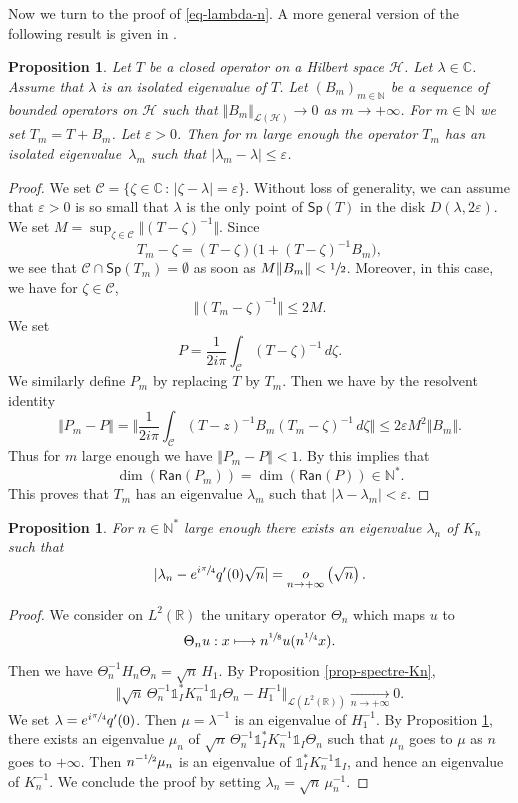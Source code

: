 \documentclass[11pt]{article}
\numberwithin{equation}{section}
\let\mathcal\mathscr
\def\mto{\mathchoice{\longmapsto}{\mapsto}{\mapsto}{\mapsto}}
\theoremstyle{plain}
\newtheorem{proposition}[theorem]{Proposition}
\theoremstyle{definition}
\newcommand {\limt}[2]{\xrightarrow[#1 \to #2]{}}
\newcommand{\abs}[1]{\vert #1\vert}
\newcommand{\nr}[1]{\Vert #1\Vert}
\newcommand{\bnr}[1]{\bigl\Vert #1\bigr\Vert}
\newcommand{\bbnr}[1]{\biggl\Vert #1\biggr\Vert}
\newcommand{\set}[1]{\{ #1\}}
\newcommand{\inv}{^{-1}}
\newcommand{\littleo}[2]{\mathop{o}\limits_{#1 \to #2}}
\newcommand{\1}{\mathds 1}
\newcommand{\st}{\,:\,}
\newcommand{\Sp}{\mathsf{Sp}}
\newcommand{\Ran}{\mathsf{Ran}}
\newcommand{\R}{\mathbb{R}}
\def\C{\mathbb{C}}
\newcommand{\N}{\mathbb{N}}
\let\e\varepsilon
\let\z\zeta
\let\Th\Theta
\let\l\lambda
\let\m\mu
\newcommand{\Hc}{{\mathcal H}}
\newcommand{\Lc}{{\mathcal L}}
\begin{document}
Now we turn to the proof of \eqref{eq-lambda-n}. A more general version of the following result is given in \cite[\S IV.3.5]{kato}.

\begin{proposition} \label{prop-perturbation-vp-kato}
Let $T$ be a closed operator on a Hilbert space $\Hc$. Let $\l \in \C$. Assume that $\l$ is an isolated eigenvalue of $T$. Let $(B_m)_{m \in \N}$ be a sequence of bounded operators on $\Hc$ such that $\nr{B_m}_{\Lc(\Hc)} \to 0$ as $m \to +\infty$. For $m \in \N$ we set \hbox{$T_m = T+B_m$}. Let $\e > 0$. Then for $m$ large enough the operator $T_m$ has an isolated eigenvalue~$\l_m$ such that $\abs{\l_m-\l} \leq \e$.
\end{proposition}

\begin{proof}
We set $\mathcal C = \set {\z \in \C\st \abs {\z - \l} = \e}$. Without loss of generality, we can assume that $\e> 0$ is so small that $\l$ is the only point of $\Sp(T)$ in the disk $D(\l,2\e)$. We set $M = \sup_{\z \in \mathcal C} \nr{(T-\z)\inv}$. Since
\[
T_m - \z = (T-\z) \bigl(1 + (T-\z)\inv B_m \bigr),
\]
we see that $\mathcal C \cap \Sp(T_m) = \emptyset$ as soon as $M \nr{B_m} < \sfrac 1 2$. Moreover, in this case, we have for $\z \in \mathcal C$,
\[
\nr{(T_m-\z)\inv} \leq 2 M.
\]
We set
\[
P = \frac 1 {2i\pi} \int_{\mathcal C} (T-\z)\inv \, d\z.
\]
We similarly define $P_m$ by replacing $T$ by $T_m$. Then we have by the resolvent identity
\[
\nr{P_m - P} = \bbnr{\frac 1 {2i\pi} \int_{\mathcal C} (T-z)\inv B_m (T_m-\z)\inv \, d\z} \leq 2\e M^2 \Vert B_m \Vert.
\]
Thus for $m$ large enough we have $\nr{P_m - P} < 1$. By \cite[\S I.4.6]{kato} this implies that
\[
\dim (\Ran (P_m)) = \dim (\Ran (P)) \in \N^*.
\]
This proves that $T_m$ has an eigenvalue $\l_m$ such that $\abs{\l - \l_m} < \e$.
\end{proof}

\begin{proposition} \label{prop-lambda-n}
For $n \in \N^*$ large enough there exists an eigenvalue $\l_n$ of $K_n$ such that
\[
\abs{\l_n -e^{i\sfrac \pi 4} q'(0) \sqrt n } = \littleo n {+\infty} \left(\sqrt n \right).
\]
\end{proposition}

\begin{proof}
We consider on $L^2(\R)$ the unitary operator $\Th_n$ which maps $u$ to
\[
\Th_n u : x \mto n^{\sfrac 18} u(n^{\sfrac 14} x).
\]
Then we have $\Th_n\inv H_n \Th_n = \sqrt n\,H_1$. By Proposition \ref{prop-spectre-Kn},
\[
\bnr{\sqrt n\,\Th_n\inv \1_I^* K_n\inv \1_I \Th_n - H_1\inv}_{\Lc(L^2(\R))} \limt n {+\infty} 0.
\]
We set $\l = e^{i\sfrac \pi 4} q'(0)$. Then $\m = \l\inv$ is an eigenvalue of $H_1\inv$. By Proposition \ref{prop-perturbation-vp-kato}, there exists an eigenvalue $\m_n$ of $\sqrt n\,\Th_n\inv \1_I^* K_n \inv \1_I \Th_n$ such that $\m_n$ goes to $\m$ as $n$ goes to $+\infty$. Then $n^{-\sfrac 12} \m_n$ is an eigenvalue of $\1_I^* K_n\inv \1_I$, and hence an eigenvalue of $K_n\inv$. We conclude the proof by setting $\l_n = \sqrt n\,\m_n\inv$.
\end{proof}
\end{document}
